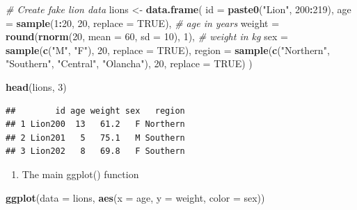 \documentclass[
]{book}
\newenvironment{Shaded}{\begin{snugshade}}{\end{snugshade}}
\newcommand{\AttributeTok}[1]{\textcolor[rgb]{0.13,0.29,0.53}{#1}}
\newcommand{\CommentTok}[1]{\textcolor[rgb]{0.56,0.35,0.01}{\textit{#1}}}
\newcommand{\ConstantTok}[1]{\textcolor[rgb]{0.56,0.35,0.01}{#1}}
\newcommand{\DecValTok}[1]{\textcolor[rgb]{0.00,0.00,0.81}{#1}}
\newcommand{\FunctionTok}[1]{\textcolor[rgb]{0.13,0.29,0.53}{\textbf{#1}}}
\newcommand{\NormalTok}[1]{#1}
\newcommand{\OtherTok}[1]{\textcolor[rgb]{0.56,0.35,0.01}{#1}}
\newcommand{\SpecialCharTok}[1]{\textcolor[rgb]{0.81,0.36,0.00}{\textbf{#1}}}
\newcommand{\StringTok}[1]{\textcolor[rgb]{0.31,0.60,0.02}{#1}}
\providecommand{\tightlist}{%
  \setlength{\itemsep}{0pt}\setlength{\parskip}{0pt}}
\begin{document}
\begin{Shaded}
\begin{Highlighting}[]
\CommentTok{\# Create fake lion data}
\NormalTok{lions }\OtherTok{\textless{}{-}} \FunctionTok{data.frame}\NormalTok{(}
  \AttributeTok{id =} \FunctionTok{paste0}\NormalTok{(}\StringTok{"Lion"}\NormalTok{, }\DecValTok{200}\SpecialCharTok{:}\DecValTok{219}\NormalTok{),}
  \AttributeTok{age =} \FunctionTok{sample}\NormalTok{(}\DecValTok{1}\SpecialCharTok{:}\DecValTok{20}\NormalTok{, }\DecValTok{20}\NormalTok{, }\AttributeTok{replace =} \ConstantTok{TRUE}\NormalTok{),          }\CommentTok{\# age in years}
  \AttributeTok{weight =} \FunctionTok{round}\NormalTok{(}\FunctionTok{rnorm}\NormalTok{(}\DecValTok{20}\NormalTok{, }\AttributeTok{mean =} \DecValTok{60}\NormalTok{, }\AttributeTok{sd =} \DecValTok{10}\NormalTok{), }\DecValTok{1}\NormalTok{), }\CommentTok{\# weight in kg}
  \AttributeTok{sex =} \FunctionTok{sample}\NormalTok{(}\FunctionTok{c}\NormalTok{(}\StringTok{"M"}\NormalTok{, }\StringTok{"F"}\NormalTok{), }\DecValTok{20}\NormalTok{, }\AttributeTok{replace =} \ConstantTok{TRUE}\NormalTok{),}
  \AttributeTok{region =} \FunctionTok{sample}\NormalTok{(}\FunctionTok{c}\NormalTok{(}\StringTok{"Northern"}\NormalTok{, }\StringTok{"Southern"}\NormalTok{, }\StringTok{"Central"}\NormalTok{, }\StringTok{"Olancha"}\NormalTok{), }\DecValTok{20}\NormalTok{, }\AttributeTok{replace =} \ConstantTok{TRUE}\NormalTok{)}
\NormalTok{)}

\FunctionTok{head}\NormalTok{(lions, }\DecValTok{3}\NormalTok{)}
\end{Highlighting}
\end{Shaded}

\begin{verbatim}
##        id age weight sex   region
## 1 Lion200  13   61.2   F Northern
## 2 Lion201   5   75.1   M Southern
## 3 Lion202   8   69.8   F Southern
\end{verbatim}

\begin{enumerate}
\def\labelenumi{\arabic{enumi}.}
\tightlist
\item
  The main ggplot() function
\end{enumerate}

\begin{Shaded}
\begin{Highlighting}[]
\FunctionTok{ggplot}\NormalTok{(}\AttributeTok{data =}\NormalTok{ lions, }\FunctionTok{aes}\NormalTok{(}\AttributeTok{x =}\NormalTok{ age, }\AttributeTok{y =}\NormalTok{ weight, }\AttributeTok{color =}\NormalTok{ sex))}
\end{Highlighting}
\end{Shaded}
\end{document}

